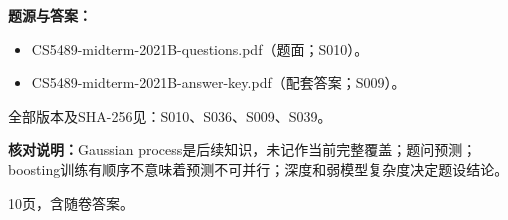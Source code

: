 \textbf{题源与答案：}

\begin{itemize}

\item CS5489-midterm-2021B-questions.pdf（题面；S010）。

\item CS5489-midterm-2021B-answer-key.pdf（配套答案；S009）。

\end{itemize}

全部版本及SHA-256见：S010、S036、S009、S039。

\textbf{核对说明：}Gaussian process是后续知识，未记作当前完整覆盖；题问预测；boosting训练有顺序不意味着预测不可并行；深度和弱模型复杂度决定题设结论。



10页，含随卷答案。

